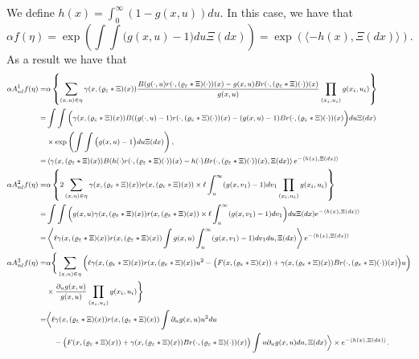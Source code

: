 \documentclass[12pt]{article}
\begin{document}
We define $h(x)=\int_{0}^{\infty} (1-g(x,u))du$. In this case, we have that $$\alpha f(\eta) = \exp \left(\int\int \big(g(x,u)-1\big) du \Xi(dx)\right)= \exp(\langle -h(x),\Xi(dx) \rangle ).$$  As a result we have that
\begin{equation}\label{Eq: Averaging the Non-local Scaling limit Lookdown Generator Part 1}
\footnotesize
\begin{aligned}
\alpha A^{1}_{nl}f(\eta )  =&
 \alpha \left\{\sum_{(x,u)\in\eta}\gamma(x, (\varrho_{\varepsilon}*\Xi)(x))\frac{B(g(\cdot,u)r( \cdot, (\varrho_{\varepsilon}* \Xi)(\cdot))(x)-g(x,u)Br( \cdot, (\varrho_{\varepsilon}* \Xi)(\cdot))(x)}{g(x,u)}\prod_{(x_i,u_i)}g(x_i,u_i)\right\}\\
 =&\int\int \bigg( \gamma(x, (\varrho_{\varepsilon}*\Xi)(x))B((g(\cdot,u)-1)r( \cdot, (\varrho_{\varepsilon}* \Xi)(\cdot))(x)-(g(x,u)-1)Br( \cdot, (\varrho_{\varepsilon}* \Xi)(\cdot))(x)\bigg)du \Xi(dx)\\
 &\times \exp \left(\int\int \big(g(x,u)-1\big) du \Xi(dx)\right),\\
 =& \left\langle \gamma(x, (\varrho_{\varepsilon}*\Xi)(x))B(h(\cdot) r( \cdot, (\varrho_{\varepsilon}* \Xi)(\cdot))(x)-h(\cdot)Br( \cdot, (\varrho_{\varepsilon}* \Xi)(\cdot))(x),\Xi(dx) \right\rangle e^{-\langle h(x),\Xi(dx)\rangle} \\
 \alpha A^{2}_{nl}f(\eta )  = &
   \alpha \left\{2\sum_{(x,u)\in\eta}\gamma(x, (\varrho_{\varepsilon}*\Xi)(x)) r(x, (\varrho_{\varepsilon}*\Xi)(x))\times \ell \int_u^{
\infty}(g(x,v_1)-1)dv_1\prod_{(x_i,u_i)}g(x_i,u_i)\right\}\\
=& \int\int \bigg(g(x,u)\gamma(x, (\varrho_{\varepsilon}*\Xi)(x)) r(x, (\varrho_{\varepsilon}*\Xi)(x))\times \ell \int_u^{
\infty}(g(x,v_1)-1)dv_1\bigg)du \Xi(dx)e^{-\langle h(x),\Xi(dx)\rangle}\\
=& 
\left\langle \ell \gamma(x, (\varrho_{\varepsilon}*\Xi)(x)) r(x, (\varrho_{\varepsilon}*\Xi)(x))\int g(x,u)\int_u^{
\infty}(g(x,v_1)-1)dv_1 du,\Xi(dx)\right\rangle e^{-\langle h(x),\Xi(dx)\rangle}\\
 \alpha A^{3}_{nl}f(\eta )  =&
\alpha \Bigg\{\sum_{(x,u)\in\eta}\bigg(\ell \gamma(x, (\varrho_{\varepsilon}*\Xi)(x)) r(x, (\varrho_{\varepsilon}*\Xi)(x)) u^2 -\big(F(x, (\varrho_{\varepsilon}*\Xi)(x))+\gamma(x, (\varrho_{\varepsilon}*\Xi)(x))Br( \cdot, (\varrho_{\varepsilon}* \Xi)(\cdot))(x)\big)u\bigg)\\
&\times \frac {\partial_u g(x,u)}{g(x,u)}\prod_{(x_i,u_i)}g(x_i,u_i)\Bigg\}\\
=& \bigg \langle \ell \gamma(x, (\varrho_{\varepsilon}*\Xi)(x)) r(x, (\varrho_{\varepsilon}*\Xi)(x))\int \partial_u g(x,u) u^2 du \\
& ~~~ - \big(F(x, (\varrho_{\varepsilon}*\Xi)(x))+\gamma(x, (\varrho_{\varepsilon}*\Xi)(x))Br( \cdot, (\varrho_{\varepsilon}* \Xi)(\cdot))(x)\big) \int u \partial_u g(x,u) du ,\Xi(dx)\bigg\rangle \times e^{-\langle h(x),\Xi(dx)\rangle} .
 \end{aligned}    
\end{equation}
\end{document}
